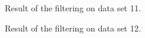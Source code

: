 \documentclass[letterpaper, 10 pt, conference]{ieeeconf}  %
\begin{document}
   \begin{figure}[thpb]
      \centering
      
      \caption{Result of the filtering on data set 11.}
      \label{test11}
   \end{figure}
   
   \begin{figure}[thpb]
      \centering
      
      \caption{Result of the filtering on data set 12.}
      \label{test12}
   \end{figure}
   
\end{document}

